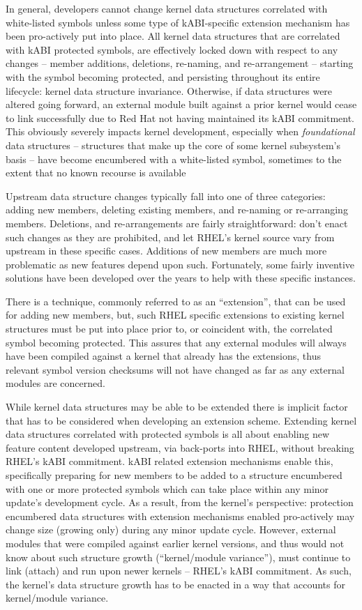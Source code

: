 \documentclass[10pt,oneside,english]{book}
\begin{document}
In general, developers cannot change kernel data structures correlated
with white-listed symbols unless some type of kABI-specific extension
mechanism has been pro-actively put into place. All kernel data structures
that are correlated with kABI protected symbols, are effectively locked
down with respect to any changes -- member additions, deletions,
re-naming, and re-arrangement -- starting with the symbol becoming
protected, and persisting throughout its entire lifecycle: kernel
data structure invariance. Otherwise, if data structures were altered
going forward, an external module built against a prior kernel would
cease to link successfully due to Red Hat not having maintained its
kABI commitment. This obviously severely impacts kernel development,
especially when \emph{foundational} data structures -- structures
that make up the core of some kernel subsystem's basis -- have become
encumbered with a white-listed symbol, sometimes to the extent that
no known recourse is available

Upstream data structure changes typically fall into one of three categories:
adding new members, deleting existing members, and re-naming or re-arranging
members. Deletions, and re-arrangements are fairly straightforward:
don't enact such changes as they are prohibited, and let RHEL's kernel
source vary from upstream in these specific cases. Additions of new
members are much more problematic as new features depend upon such.
Fortunately, some fairly inventive solutions have been developed over
the years to help with these specific instances.

There is a technique, commonly referred to as an ``extension'',
that can be used for adding new members, but, such RHEL specific extensions
to existing kernel structures must be put into place prior to, or
coincident with, the correlated symbol becoming protected. This assures
that any external modules will always have been compiled against a
kernel that already has the extensions, thus relevant symbol version
checksums will not have changed as far as any external modules are
concerned.

While kernel data structures may be able to be extended there is implicit
factor that has to be considered when developing an extension scheme.
Extending kernel data structures correlated with protected symbols
is all about enabling new feature content developed upstream, via
back-ports into RHEL, without breaking RHEL's kABI commitment. kABI
related extension mechanisms enable this, specifically preparing for
new members to be added to a structure encumbered with one or more
protected symbols which can take place within any minor update's development
cycle. As a result, from the kernel's perspective: protection encumbered
data structures with extension mechanisms enabled pro-actively may
change size (growing only) during any minor update cycle. However,
external modules that were compiled against earlier kernel versions,
and thus would not know about such structure growth (``kernel/module
variance''), must continue to link (attach) and run upon newer kernels
-- RHEL's kABI commitment. As such, the kernel's data structure growth
has to be enacted in a way that accounts for kernel/module variance.
\end{document}
